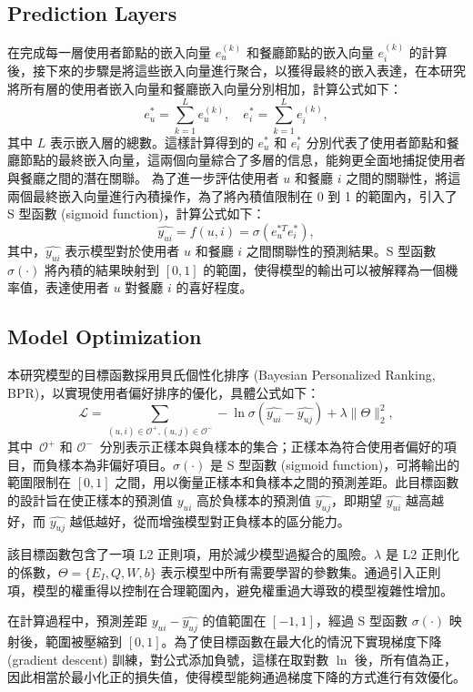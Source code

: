 \subsection{Prediction Layers}
    在完成每一層使用者節點的嵌入向量 $e_u^{(k)}$ 和餐廳節點的嵌入向量 $e_i^{(k)}$ 的計算後，接下來的步驟是將這些嵌入向量進行聚合，以獲得最終的嵌入表達，在本研究將所有層的使用者嵌入向量和餐廳嵌入向量分別相加，計算公式如下： 
    \begin{equation} 
        e_u^* = \sum_{k=1}^{L} e_u^{(k)}, \quad e_i^* = \sum_{k=1}^{L} e_i^{(k)}, 
    \end{equation} 
    其中 $L$ 表示嵌入層的總數。這樣計算得到的 $e_u^*$ 和 $e_i^*$ 分別代表了使用者節點和餐廳節點的最終嵌入向量，這兩個向量綜合了多層的信息，能夠更全面地捕捉使用者與餐廳之間的潛在關聯。
    為了進一步評估使用者 $u$ 和餐廳 $i$ 之間的關聯性，將這兩個最終嵌入向量進行內積操作，為了將內積值限制在 0 到 1 的範圍內，引入了 S 型函數 (sigmoid function)，計算公式如下： 
    \begin{equation} 
        \hat{y_{ui}} = f(u, i) = \sigma(e_u^{*T} e_i^*), 
    \end{equation} 
    其中，$\hat{y_{ui}}$ 表示模型對於使用者 $u$ 和餐廳 $i$ 之間關聯性的預測結果。S 型函數 $\sigma(\cdot)$ 將內積的結果映射到 $[0, 1]$ 的範圍，使得模型的輸出可以被解釋為一個機率值，表達使用者 $u$ 對餐廳 $i$ 的喜好程度。

\subsection{Model Optimization}
    本研究模型的目標函數採用貝氏個性化排序 (Bayesian Personalized Ranking, BPR)，以實現使用者偏好排序的優化，具體公式如下：
    \begin{equation}
        \mathcal{L} = \sum_{(u, i) \in \mathcal{O^+}, (u, j) \in \mathcal{O^-}} -\ln\sigma(\hat{y_{ui}} - \hat{y_{uj}}) + \lambda\lVert \Theta \rVert_2^2,
    \end{equation}
    其中~$\mathcal{O^+}$ 和 $\mathcal{O^-}$~分別表示正樣本與負樣本的集合；正樣本為符合使用者偏好的項目，而負樣本為非偏好項目。$\sigma(\cdot)$ 是 S 型函數 (sigmoid function)，可將輸出的範圍限制在 $[0, 1]$ 之間，用以衡量正樣本和負樣本之間的預測差距。此目標函數的設計旨在使正樣本的預測值 $\hat{y_{ui}}$ 高於負樣本的預測值 $\hat{y_{uj}}$，即期望 $\hat{y_{ui}}$ 越高越好，而 $\hat{y_{uj}}$ 越低越好，從而增強模型對正負樣本的區分能力。

    該目標函數包含了一項 L2 正則項，用於減少模型過擬合的風險。$\lambda$ 是 L2 正則化的係數，$\Theta = \{E_I, Q, W, b\}$ 表示模型中所有需要學習的參數集。通過引入正則項，模型的權重得以控制在合理範圍內，避免權重過大導致的模型複雜性增加。

    在計算過程中，預測差距 $\hat{y_{ui}} - \hat{y_{uj}}$ 的值範圍在 $[-1, 1]$，經過 S 型函數 $\sigma(\cdot)$ 映射後，範圍被壓縮到 $[0, 1]$。為了使目標函數在最大化的情況下實現梯度下降 (gradient descent) 訓練，對公式添加負號，這樣在取對數 $\ln$ 後，所有值為正，因此相當於最小化正的損失值，使得模型能夠通過梯度下降的方式進行有效優化。
